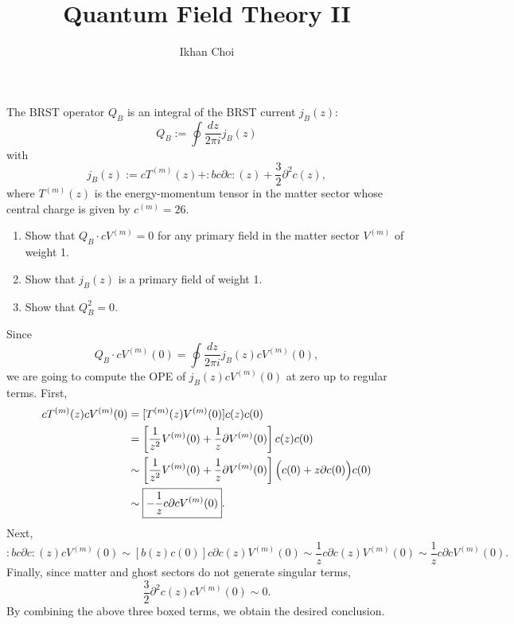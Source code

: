 \documentclass{../../../small}
\begin{document}
\title{Quantum Field Theory II}
\author{Ikhan Choi}
\maketitle

\renewcommand{\theprb}{\arabic{prb}}
\setcounter{prb}{0}

\begin{prb}
The BRST operator $Q_B$ is an integral of the BRST current $j_B(z)$:
\[Q_B:=\oint\frac{dz}{2\pi i}j_B(z)\]
with
\[j_B(z):=cT^{(m)}(z)+:bc\partial c:(z)+\frac32\partial^2c(z),\]
where $T^{(m)}(z)$ is the energy-momentum tensor in the matter sector whose central charge is given by $c^{(m)}=26$.
\begin{enumerate}[(1)]
\item Show that $Q_B\cdot cV^{(m)}=0$ for any primary field in the matter sector $V^{(m)}$ of weight 1.
\item Show that $j_B(z)$ is a primary field of weight 1.
\item Show that $Q_B^2=0$.
\end{enumerate}
\end{prb}
\begin{pf}[Solution of (1)]
Since
\[Q_B\cdot cV^{(m)}(0)=\oint\frac{dz}{2\pi i}j_B(z)cV^{(m)}(0),\]
we are going to compute the OPE of $j_B(z)cV^{(m)}(0)$ at zero up to regular terms.
First,
\begin{align*}
cT^{(m)}(z)cV^{(m)}(0)
&=[T^{(m)}(z)V^{(m)}(0)]c(z)c(0)\\
&=\left[\frac1{z^2}V^{(m)}(0)+\frac1z\partial V^{(m)}(0)\right]c(z)c(0)\\
&\sim\left[\frac1{z^2}V^{(m)}(0)+\frac1z\partial V^{(m)}(0)\right]\Bigl(c(0)+z\partial c(0)\Bigr)c(0)\\
&\sim\boxed{-\frac1zc\partial cV^{(m)}(0)}.
\end{align*}
Next,
\[:bc\partial c:(z)cV^{(m)}(0)
\sim[b(z)c(0)]c\partial c(z)V^{(m)}(0)
\sim\frac1zc\partial c(z)V^{(m)}(0)
\sim\boxed{\frac1zc\partial cV^{(m)}(0)}.\]
Finally, since matter and ghost sectors do not generate singular terms,
\[\frac32\partial^2c(z)cV^{(m)}(0)\sim\boxed{0}.\]
By combining the above three boxed terms, we obtain the desired conclusion.
\end{pf}
\end{document}
